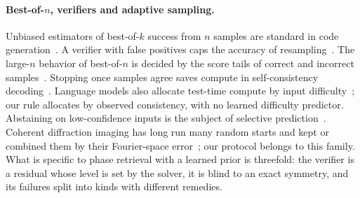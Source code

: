 \paragraph{Best-of-$n$, verifiers and adaptive sampling.}
Unbiased estimators of best-of-$k$ success from $n$ samples are standard in code generation~\cite{chen2021codex}.
A verifier with false positives caps the accuracy of resampling~\cite{stroebl2026limits}.
The large-$n$ behavior of best-of-$n$ is decided by the score tails of correct and incorrect samples~\cite{yano2026tail}.
Stopping once samples agree saves compute in self-consistency decoding~\cite{aggarwal2023adaptive,li2024escape}.
Language models also allocate test-time compute by input difficulty~\cite{snell2025scaling,damani2025hard}; our rule allocates by observed consistency, with no learned difficulty predictor.
Abstaining on low-confidence inputs is the subject of selective prediction~\cite{geifman2017selective}.
Coherent diffraction imaging has long run many random starts and kept or combined them by their Fourier-space error~\cite{chen2007ghio,chapman2006highres}; our protocol belongs to this family.
What is specific to phase retrieval with a learned prior is threefold: the verifier is a residual whose level is set by the solver, it is blind to an exact symmetry, and its failures split into kinds with different remedies.

